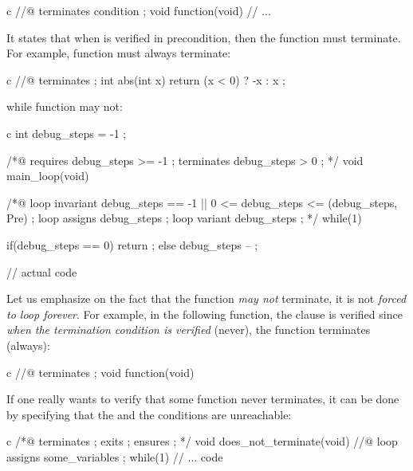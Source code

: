 \begin{CodeBlock}{c}
//@ terminates condition ;
void function(void){
  // ...
}
\end{CodeBlock}



It states that when  is verified in precondition, then
the function must terminate. For example, function  must always
terminate:



\begin{CodeBlock}{c}
//@ terminates \true ;
int abs(int x){
  return (x < 0) ? -x : x ;
}
\end{CodeBlock}



while function  may not:



\begin{CodeBlock}{c}
int debug_steps = -1 ;

/*@ requires debug_steps >= -1 ;
    terminates debug_steps > 0 ;
 */
void main_loop(void){
  /*@ loop invariant debug_steps == -1
                  || 0 <= debug_steps <= \at(debug_steps, Pre) ;
      loop assigns debug_steps ;
      loop variant debug_steps ; */
  while(1){
    if(debug_steps == 0) return ;
    else debug_steps -- ;

    // actual code
  }
}
\end{CodeBlock}



Let us emphasize on the fact that the function {\em may not} terminate, it is
not {\em forced to loop forever}. For example, in the following function, the
 clause is verified since
{\em when the termination condition is verified} (never), the function
terminates (always):



\begin{CodeBlock}{c}
//@ terminates \false ;
void function(void){

}
\end{CodeBlock}



\begin{Information}
  If one really wants to verify that some function never terminates, it can be
  done by specifying that the  and the 
  conditions are unreachable:
  \begin{CodeBlock}{c}
/*@ terminates \false;
    exits \false;
    ensures \false;
*/
void does_not_terminate(void){
  //@ loop assigns some_variables ;
  while(1){
    // ... code
  }
}\end{CodeBlock}
\end{Information}



